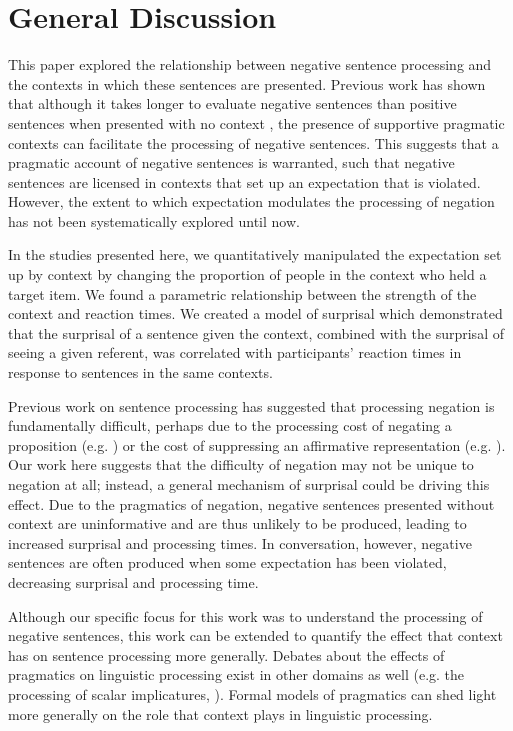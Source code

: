 \documentclass[10pt,letterpaper]{article}
\begin{document}
\section{General Discussion}

This paper explored the relationship between negative sentence processing and the contexts in which these sentences are presented.  Previous work has shown that although it takes longer to evaluate negative sentences than positive sentences when presented with no context \cite{carpenter1975, just1971, just1976, hclark1972}, the presence of supportive pragmatic contexts \cite{wason1965, dale2011, glenberg1999, ludtke2006} can facilitate the processing of negative sentences.  This suggests that a pragmatic account of negative sentences is warranted, such that negative sentences are licensed in contexts that set up an expectation that is violated.  However, the extent to which expectation modulates the processing of negation has not been systematically explored until now.  

In the studies presented here, we quantitatively manipulated the expectation set up by context by changing the proportion of people in the context who held a target item.  We found a parametric relationship between the strength of the context and reaction times.  We created a model of surprisal which demonstrated that the surprisal of a sentence given the context, combined with the surprisal of seeing a given referent, was correlated with participants' reaction times in response to sentences in the same contexts.  

Previous work on sentence processing has suggested that processing negation is fundamentally difficult, perhaps due to the processing cost of negating a proposition (e.g. ) or the cost of suppressing an affirmative representation (e.g. ).  Our work here suggests that the difficulty of negation may not be unique to negation at all; instead, a general mechanism of surprisal could be driving this effect.  Due to the pragmatics of negation, negative sentences presented without context are uninformative and are thus unlikely to be produced, leading to increased surprisal and processing times.  In conversation, however, negative sentences are often produced when some expectation has been violated, decreasing surprisal and processing time.  

Although our specific focus for this work was to understand the processing of negative sentences, this work can be extended to quantify the effect that context has on sentence processing more generally.  Debates about the effects of pragmatics on linguistic processing exist in other domains as well (e.g. the processing of scalar implicatures, ).  Formal models of pragmatics can shed light more generally on the role that context plays in linguistic processing. 
\end{document}
